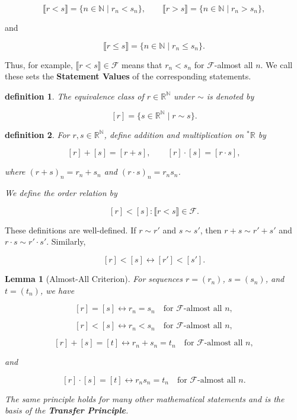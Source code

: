 \documentclass[10pt,a4paper]{book}
\newtheorem{definition}{definition}[section]
\newtheorem{lemma}{Lemma}[section]
\begin{document}
$$
    \llbracket r<s\rrbracket=\{n\in\mathbb N \mid r_n<s_n\},
    \qquad
    \llbracket r>s\rrbracket=\{n\in\mathbb N \mid r_n>s_n\},
$$

and

$$
    \llbracket r\leq s\rrbracket=\{n\in\mathbb N \mid r_n\leq s_n\}.
$$

Thus, for example, \(\llbracket r<s\rrbracket\in\mathcal F\) means that
\(r_n<s_n\) for \(\mathcal F\)-almost all \(n\). We call these sets the
\textbf{Statement Values} of the corresponding statements.


\begin{definition}

    The equivalence class of \(r\in\mathbb R^{\mathbb N}\) under \(\sim\) is
    denoted by

    $$
        [r]=\{s\in\mathbb R^{\mathbb N} \mid r\sim s\}.
    $$

\end{definition}

\begin{definition}

    For \(r,s\in\mathbb R^{\mathbb N}\), define addition and multiplication on
    \({}^\ast\mathbb R\) by

    $$
        [r]+[s]=[r+s],
        \qquad
        [r]\cdot[s]=[r\cdot s],
    $$

    where \((r+s)_n=r_n+s_n\) and \((r\cdot s)_n=r_ns_n\).

    We define the order relation by

    $$
        [r]<[s]
        :
        \llbracket r<s\rrbracket\in\mathcal F.
    $$

\end{definition}

These definitions are well-defined. If \(r\sim r'\) and \(s\sim s'\), then
\(r+s\sim r'+s'\) and \(r\cdot s\sim r'\cdot s'\). Similarly,

$$
    [r]<[s]\leftrightarrow[r']<[s'].
$$

\begin{lemma}[Almost-All Criterion]

    For sequences \(r=(r_n)\), \(s=(s_n)\), and \(t=(t_n)\), we have

    $$
        [r]=[s]
        \leftrightarrow
        r_n=s_n
        \quad\text{for \(\mathcal F\)-almost all }n,
    $$

    $$
        [r]<[s]
        \leftrightarrow
        r_n<s_n
        \quad\text{for \(\mathcal F\)-almost all }n,
    $$

    $$
        [r]+[s]=[t]
        \leftrightarrow
        r_n+s_n=t_n
        \quad\text{for \(\mathcal F\)-almost all }n,
    $$

    and

    $$
        [r]\cdot[s]=[t]
        \leftrightarrow
        r_ns_n=t_n
        \quad\text{for \(\mathcal F\)-almost all }n.
    $$

    The same principle holds for many other mathematical statements and is the
    basis of the \textbf{Transfer Principle}.

\end{lemma}
\end{document}
